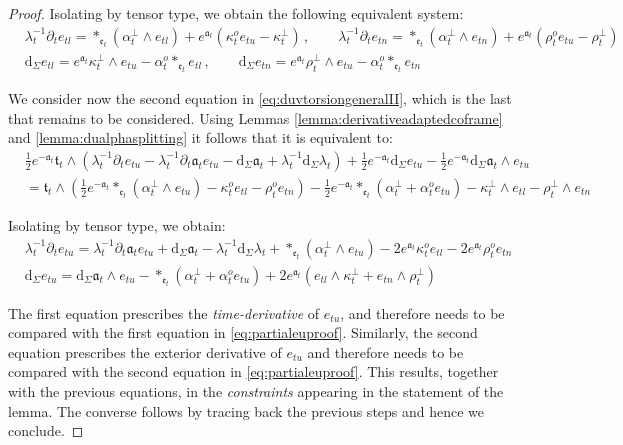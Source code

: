 \documentclass[10pt,reqno,a4paper]{amsart}
\theoremstyle{plain}
\theoremstyle{definition}
\theoremstyle{remark}
\theoremstyle{remark}
\newcommand{\frt}{\mathfrak{t}}
\def\dd{\mathrm{d}}
\def\fra{\mathfrak{a}}
\def\fre{\mathfrak{e}}
\renewcommand{\(}{ (}
\renewcommand{\)}{ )}
\begin{document}
\begin{proof}
\noindent
Isolating by tensor type, we obtain the following equivalent system:
\begin{eqnarray*}
& \lambda_t^{-1} \partial_t e_{tl} = \ast_{\fre_t} (\alpha^{\perp}_t \wedge e_{tl}) +  e^{\fra_t} (\kappa^o_t e_{tu} - \kappa^{\perp}_t) \, , \qquad  \lambda_t^{-1} \partial_t e_{tn} = \ast_{\fre_t} (\alpha^{\perp}_t\wedge e_{tn})  + e^{\fra_t} (\rho^o_t e_{tu} - \rho^{\perp}_t) \\
& \dd_{\Sigma} e_{tl} = e^{\fra_t} \kappa^{\perp}_t\wedge e_{tu} - \alpha^o_t \ast_{\fre_t} e_{tl}\, , \qquad \dd_{\Sigma} e_{tn} = e^{\fra_t} \rho^{\perp}_t\wedge e_{tu}  - \alpha^o_t \ast_{\fre_t} e_{tn}   
\end{eqnarray*}
	
\noindent
We consider now the second equation in  \eqref{eq:duvtorsiongeneralII}, which is the last that remains to be considered. Using Lemmas \ref{lemma:derivativeadaptedcoframe} and \ref{lemma:dualphasplitting} it follows that it is equivalent to:
\begin{eqnarray*}
& \frac{1}{2} e^{-\fra_t}  \frt_t \wedge (\lambda_t^{-1} \partial_t e_{tu} - \lambda_t^{-1}\partial_t \fra_t e_{tu} - \dd_{\Sigma} \fra_t + \lambda_t^{-1} \dd_{\Sigma} \lambda_t) + \frac{1}{2} e^{-\fra_t}  \dd_{\Sigma} e_{tu} - \frac{1}{2} e^{-\fra_t}  \dd_{\Sigma} \fra_t \wedge e_{tu} \\
& =  \frt_t  \wedge ( \frac{1}{2} e^{-\fra_t} \ast_{\fre_t} (\alpha^{\perp}_t \wedge e_{tu}) - \kappa^o_t e_{tl} - \rho^o_t e_{tn}) -   \frac{1}{2} e^{-\fra_t} \ast_{\fre_t}(\alpha^{\perp}_t + \alpha^o_t e_{tu})  - \kappa^{\perp}_t \wedge e_{tl} - \rho^{\perp}_t \wedge e_{tn}
\end{eqnarray*}
	
\noindent
Isolating by tensor type, we obtain:
\begin{eqnarray}
&  \lambda_t^{-1} \partial_t e_{tu}    = \lambda_t^{-1}\partial_t \fra_t e_{tu} + \dd_{\Sigma} \fra_t - \lambda_t^{-1} \dd_{\Sigma} \lambda_t +   \ast_{\fre_t} (\alpha^{\perp}_t \wedge e_{tu}) -2 e^{\fra_t}\kappa^o_t e_{tl} - 2 e^{\fra_t} \rho^o_t e_{tn}  \\
&  \dd_{\Sigma} e_{tu}  = \dd_{\Sigma} \fra_t \wedge e_{tu} - \ast_{\fre_t}(\alpha^{\perp}_t +  \alpha^o_t e_{tu})   +  2 e^{\fra_t}( e_{tl} \wedge \kappa^{\perp}_t +   e_{tn} \wedge \rho^{\perp}_t)   \label{eq:auxiliaryeuII}
\end{eqnarray}
	
\noindent
The first equation prescribes the \emph{time-derivative} of $e_{tu}$, and therefore needs to be compared with the first equation in \eqref{eq:partialeuproof}. Similarly, the second equation prescribes the exterior derivative of $e_{tu}$ and therefore needs to be compared with the second equation in \eqref{eq:partialeuproof}. This results, together with the previous equations, in the \emph{constraints} appearing in the statement of the lemma. The converse follows by tracing back the previous steps and hence we conclude. 
\end{proof}
\end{document}
